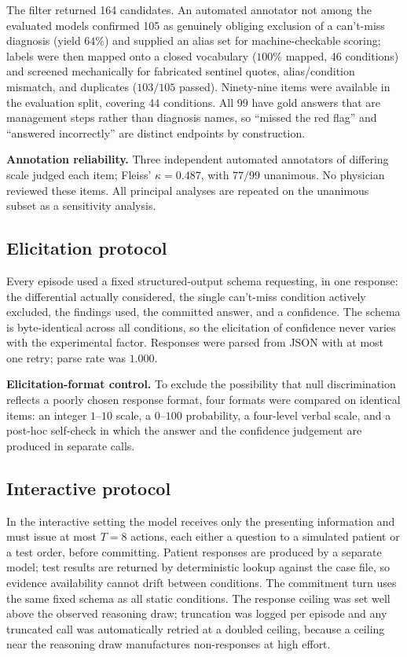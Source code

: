 \documentclass[journal,twoside]{IEEEtran}
\begin{document}
The filter returned 164 candidates. An automated annotator not among the evaluated models confirmed
105 as genuinely obliging exclusion of a can't-miss diagnosis (yield $64\%$) and supplied an alias
set for machine-checkable scoring; labels were then mapped onto a closed vocabulary ($100\%$ mapped,
46 conditions) and screened mechanically for fabricated sentinel quotes, alias/condition mismatch,
and duplicates ($103/105$ passed). Ninety-nine items were available in the evaluation split,
covering 44 conditions. All 99 have gold answers that are management steps rather than diagnosis
names, so ``missed the red flag'' and ``answered incorrectly'' are distinct endpoints by
construction.

\textbf{Annotation reliability.} Three independent automated annotators of differing scale judged
each item; Fleiss' $\kappa = 0.487$, with $77/99$ unanimous. No physician reviewed these items. All
principal analyses are repeated on the unanimous subset as a sensitivity analysis.

\subsection{Elicitation protocol}
Every episode used a fixed structured-output schema requesting, in one response: the differential
actually considered, the single can't-miss condition actively excluded, the findings used, the
committed answer, and a confidence. The schema is byte-identical across all conditions, so the
elicitation of confidence never varies with the experimental factor. Responses were parsed from JSON
with at most one retry; parse rate was $1.000$.

\textbf{Elicitation-format control.} To exclude the possibility that null discrimination reflects a
poorly chosen response format, four formats were compared on identical items: an integer $1$--$10$
scale, a $0$--$100$ probability, a four-level verbal scale, and a post-hoc self-check in which the
answer and the confidence judgement are produced in separate calls.

\subsection{Interactive protocol}
In the interactive setting the model receives only the presenting information and must issue at most
$T=8$ actions, each either a question to a simulated patient or a test order, before committing.
Patient responses are produced by a separate model; test results are returned by deterministic lookup
against the case file, so evidence availability cannot drift between conditions. The commitment turn
uses the same fixed schema as all static conditions. The response ceiling was set well above the
observed reasoning draw; truncation was logged per episode and any truncated call was automatically
retried at a doubled ceiling, because a ceiling near the reasoning draw manufactures non-responses at
high effort.
\end{document}
